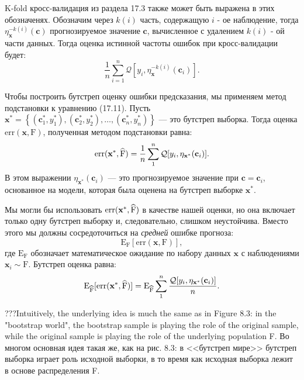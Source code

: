K-fold кросс-валидация из раздела 17.3 также может быть выражена в этих обозначенях. Обозначим через $k(i)$ часть, содержащую $i$ - ое наблюдение, тогда $\eta_{\textbf{x}}^{-k(i)}(\textbf{c})$ прогнозируемое значение $\textbf{c}$, вычисленное с удалением $k (i)$ - ой части данных. Тогда оценка истинной частоты ошибок при кросс-валидации будет:
\begin{equation}
\frac{1}{n} \sum_{i = 1}^{n} \mathcal{Q} [y_{i}, \eta_{\textbf{x}} ^{-k(i)}(\textbf{c}_{i})].
\end{equation}

Чтобы построить бутстреп оценку ошибки предсказания, мы применяем метод подстановки к уравнению (17.11). Пусть $\textbf{x}^{*} = \left \{  (\textbf{c}^{*}_{1}, y^{*}_{1}), (\textbf{c}^{*}_{2}, y^{*}_{2}),\ldots,(\textbf{c}^{*}_{n}, y^{*}_{n})\right \}$ --- это
бутстреп выборка. Тогда оценка $\text{err}(\textbf{x}, \text{F})$, полученная методом подстановки равна:
\begin{equation}
\text{err}(\textbf{x}^{*}, \widehat{\text{F}})= \frac{1}{n} \sum^{n}_{1} \mathcal{Q}[y_{i},  \eta_{\textbf{x}^{*}}(\textbf{c}_{i})].
\end{equation}
В этом выражении $\eta_{\textbf{x}^{*}}(\textbf{c}_{i})$ --- это прогнозируемое значение при $\textbf{c} = \textbf{c}_{i}$, основанное на модели, которая была оценена на бутстреп выборке $\textbf{x}^{*}$.

Мы могли бы использовать $\text{err}(\textbf{x}^{*}, \widehat{\text{F}})$ в качестве нашей оценки, но она включает только одну бутстреп выборку и, следовательно, слишком неустойчива. Вместо этого мы должны сосредоточиться на \textit{средней} ошибке прогноза:
\begin{equation}
\mathrm{E}_{\text{F}}[\text{err}(\textbf{x}, \text{F})],
\end{equation}
где $\mathrm{E}_{\text{F}}$ обозначает математическое ожидание по набору данных $\mathbf{x}$ с наблюдениями $\mathbf{x}_{i} \sim \text{F}$. Бутстреп оценка равна:
\begin{equation}
\mathrm{E}_{\widehat{\text{F}}}[\text{err}(\textbf{x}^{*}, \widehat{\text{F}})] = \mathrm{E}_{\widehat{\text{F}}} \sum_{1}^{n} \frac{  \mathcal{Q}[y_{i},  \eta_{\textbf{x}^{*}}(\textbf{c}_{i})]}{n}.
\end{equation}

???Intuitively, the underlying idea is much the same as in Figure 8.3: in the "bootstrap world", the bootstrap sample is playing the role of the original sample, while the original sample is playing the role of the underlying population F.
Во многом основная идея такая же, как на рис. 8.3: в <<бутстреп мире>> бутстреп выборка играет роль исходной выборки, в то время как исходная выборка лежит в основе распределения F.

